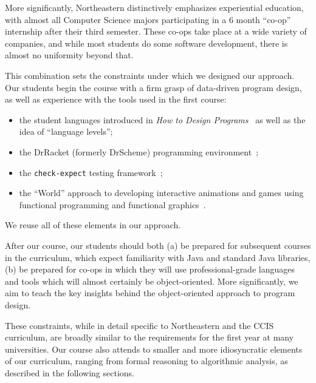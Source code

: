 \documentclass[submission,copyright]{eptcs}
\begin{document}
More significantly, Northeastern distinctively emphasizes experiential
education, with almost all Computer Science majors participating in a
6 month ``co-op'' internship after their third semester.  These co-ops
take place at a wide variety of companies, and while most students do
some software development, there is almost no uniformity beyond that. 

This combination sets the constraints under which we designed our
approach.  Our students begin the course with a firm grasp of
data-driven program design, as well as experience with the tools used
in the first course:

\begin{itemize}
  \item the student languages introduced in \emph{How to Design
    Programs}~\cite{dvanhorn:Felleisen2004Structure,
    dvanhorn:Felleisen2001How} as well as the idea of ``language levels'';

  \item the DrRacket (formerly DrScheme) 
    programming environment~\cite{dvanhorn:Findler2002DrScheme};

  \item the \texttt{check-expect} testing framework~\cite{local:check-expect};

  \item the ``World'' approach to developing interactive animations
    and games using functional programming and functional
    graphics~\cite{dvanhorn:Felleisen2009Functional,
      local:barland-sfp10}.
\end{itemize}

\noindent
We reuse all of these elements in our approach.

After our course, our students should both (a) be prepared for
subsequent courses in the curriculum, which expect familiarity with
Java and standard Java libraries, (b) be prepared for co-ops in which
they will use professional-grade languages and tools which will
almost certainly be object-oriented.  More significantly, we aim to
teach the key insights behind the object-oriented approach to program
design.

These constraints, while in detail specific to Northeastern and the
CCIS curriculum, are broadly similar to the requirements for the first
year at many universities.  Our course also attends to smaller and
more idiosyncratic elements of our curriculum, ranging from formal
reasoning to algorithmic analysis, as described in the following
sections.
\end{document}
